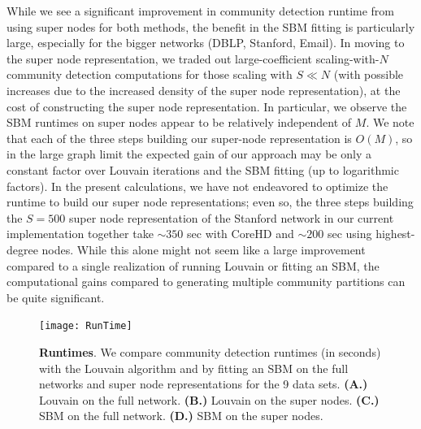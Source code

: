 While we see a significant improvement in community detection runtime from using super nodes for both methods, the benefit in the SBM fitting is particularly large, especially for the bigger networks (DBLP, Stanford, Email). In moving to the super node representation, we traded out large-coefficient scaling-with-$N$ community detection computations for those scaling with $S\ll N$ (with possible increases due to the increased density of the super node representation), at the cost of constructing the super node representation. In particular, we observe the SBM runtimes on super nodes appear to be relatively independent of $M$. We note that each of the three steps building our super-node representation is $O(M)$, so in the large graph limit the expected gain of our approach may be only a constant factor over Louvain iterations and the SBM fitting (up to logarithmic factors). In the present calculations, we have not endeavored to optimize the runtime to build our super node representations; even so, the three steps building the $S=500$ super node representation of the Stanford network in our current implementation together take $\sim 350$ sec with CoreHD and $\sim 200$ sec using highest-degree nodes. While this alone might not seem like a large improvement compared to a single realization of running Louvain or fitting an SBM, the computational gains compared to generating multiple community partitions can be quite significant.  %
 
\begin{figure}
\centering
\texttt{[image: RunTime]}
\caption{{\bf Runtimes}. We compare community detection runtimes (in seconds) with the Louvain algorithm and by fitting an SBM on the full networks and super node representations for the 9 data sets. {\bf (A.)} Louvain on the full network. {\bf (B.)} Louvain  on the super nodes. {\bf (C.)} SBM on the full network. {\bf (D.)} SBM on the super nodes.}\label{RT}
\end{figure}

